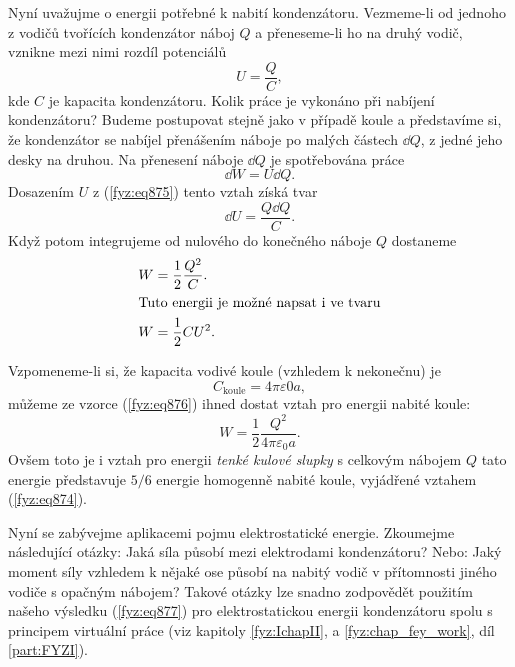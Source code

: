     Nyní uvažujme o energii potřebné k nabití kondenzátoru. Vezmeme-li od jednoho z vodičů tvořících
    kondenzátor náboj \(Q\) a přeneseme-li ho na druhý vodič, vznikne mezi nimi rozdíl potenciálů
    \begin{equation}\label{fyz:eq875}
      U = \dfrac{Q}{C},
    \end{equation}
    kde \(C\) je kapacita kondenzátoru. Kolik práce je vykonáno při nabíjení kondenzátoru? Budeme
    postupovat stejně jako v případě koule a představíme si, že kondenzátor se nabíjel přenášením
    náboje po malých částech \(\dd{Q}\), z jedné jeho desky na druhou. Na přenesení náboje
    \(\dd{Q}\) je spotřebována práce
    \begin{equation*}
      \dd{W} = U\dd{Q}.
    \end{equation*}
    Dosazením \(U\) z (\ref{fyz:eq875}) tento vztah získá tvar
    \begin{equation*}
      \dd{U} = \dfrac{Q\dd{Q}}{C}.
    \end{equation*}
    Když potom integrujeme od nulového do konečného náboje \(Q\) dostaneme
    \begin{align}
      W &= \dfrac{1}{2}\dfrac{Q^2}{C}.  \label{fyz:eq876}     \\
      \shortintertext{Tuto energii je možné napsat i ve tvaru}
      W &= \dfrac{1}{2}CU^2.            \label{fyz:eq877}
    \end{align} 

    Vzpomeneme-li si, že kapacita vodivé koule (vzhledem k nekonečnu) je
    \begin{equation*}
      C_{\text{koule}} = 4π\varepsilon0a,
    \end{equation*}
    můžeme ze vzorce (\ref{fyz:eq876}) ihned dostat vztah pro energii nabité koule:
    \begin{equation}\label{fyz:eq878}
      W=\dfrac{1}{2}\dfrac{Q^2}{4π\varepsilon_0a}.
    \end{equation}
    Ovšem toto je i vztah pro energii \emph{tenké kulové slupky} s celkovým nábojem \(Q\) tato
    energie představuje \(5/6\) energie homogenně nabité koule, vyjádřené vztahem (\ref{fyz:eq874}).

    Nyní se zabývejme aplikacemi pojmu elektrostatické energie. Zkoumejme následující otázky: Jaká
    síla působí mezi elektrodami kondenzátoru? Nebo: Jaký moment síly vzhledem k nějaké ose působí
    na nabitý vodič v přítomnosti jiného vodiče s opačným nábojem? Takové otázky lze snadno
    zodpovědět použitím našeho výsledku (\ref{fyz:eq877}) pro elektrostatickou energii kondenzátoru
    spolu s principem virtuální práce (viz kapitoly \ref{fyz:IchapII}, a \ref{fyz:chap_fey_work},
    díl \ref{part:FYZI}).

